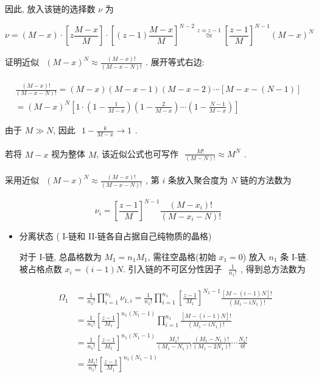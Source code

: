 \documentclass[../../main.tex]{subfiles}
\begin{document}
\begin{enumerate}
{{因此, 放入该链的选择数 $\nu$ 为

$$
\nu = (M-x) \cdot \left[z\frac{M-x}{M}\right] \cdot \left[(z-1)\frac{M-x}{M}\right]^{N-2}\overset{z\approx z-1}{\simeq} \left[\frac{z-1}{M}\right]^{N-1}(M-x)^{N}
$$

证明近似 $\begin{aligned}(M-x)^{N}\approx\frac{(M-x)!}{(M-x-N)!}\end{aligned}$. 展开等式右边: 

$$
\begin{aligned}
\frac{(M-x)!}{(M-x-N)!} = (M-x)(M-x-1)(M-x-2)\cdots [M-x-(N-1)]\\
= (M-x)^{N}\left[
    1\cdot \left(1 - \frac{1}{M-x}\right)\left(1 - \frac{2}{M-x}\right) \cdots\left(1 - \frac{N-1}{M-x}\right)
\right]
\end{aligned}
$$

由于 $M\gg N$, 因此 $\begin{aligned}1 - \frac{k}{M-x}\to 1\end{aligned}$. 

若将 $M-x$ 视为整体 $M$, 该近似公式也可写作 $\begin{aligned}\frac{M!}{(M-N)!} \approx M^{N}\end{aligned}$.

采用近似 $\begin{aligned}(M-x)^{N}\approx\frac{(M-x)!}{(M-x-N)!}\end{aligned}$, 第 $i$ 条放入聚合度为 $N$ 链的方法数为

$$
\nu_{i} = \left[\frac{z-1}{M}\right]^{N-1}\frac{(M-x_{i})!}{(M-x_{i}-N)!}
$$

\begin{itemize}
    \item 分离状态 ( I-链和 II-链各自占据自己纯物质的晶格)

对于 I-链, 总晶格数为 $M_{1} = n_{1}M_{1}$, 需往空晶格(初始 $x_{1}=0$) 放入 $n_{1}$ 条 I-链. 被占格点数 $x_{i} = (i-1)N $. 引入链的不可区分性因子 $\begin{aligned}\frac{1}{n_{1}!}\end{aligned}$, 得到总方法数为

$$
\begin{aligned}
\Omega_{1} &= \frac{1}{n_{1}!}\prod_{i=1}^{n_{1}}\nu_{1,i} = \frac{1}{n_{1}!}\prod_{i=1}^{n_{1}}\left[\frac{z-1}{M_{1}}\right]^{N_{1}-1}\frac{[M-(i-1)N]!}{(M_{1}-iN_{1})!}\\
&= \frac{1}{n_{1}!}\left[\frac{z-1}{M_{1}}\right]^{n_{1}(N_{1}-1)}\prod_{i=1}^{n_{1}}\frac{[M-(i-1)N]!}{(M_{1}-iN_{1})!}\\
&= \frac{1}{n_{1}!}\left[\frac{z-1}{M_{1}}\right]^{n_{1}(N_{1}-1)} 
\frac{M_{1}!}{(M_{1}-N_{1})!}
\frac{(M_{1}-N_{1})!}{(M_{1}-2N_{1})!}\cdots
\frac{N_{1}!}{0!}\\
&= \frac{M_{1}!}{n_{1}!}\left[\frac{z-1}{M_{1}}\right]^{n_{1}(N_{1}-1)}
\end{aligned}
$$


\end{itemize}}}
\end{enumerate}
\end{document}
